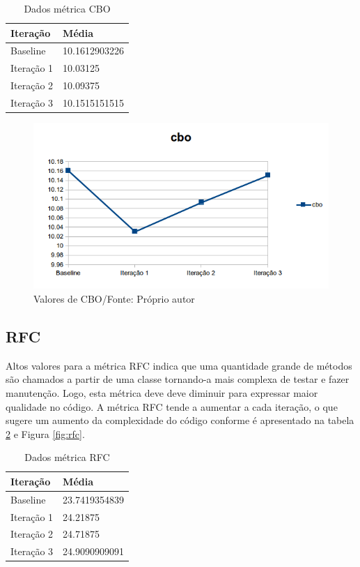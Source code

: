 \begin{table}[!h]
	\centering
	    \caption{Dados métrica CBO}
	
    \begin{tabular}{ | l | l | }
    \hline
    Iteração & Média 			\\ \hline
    Baseline & 10.1612903226   	\\ \hline
    Iteração 1 & 10.03125		\\ \hline
	Iteração 2 & 10.09375		\\ \hline
	Iteração 3 & 10.1515151515	\\ \hline
    \end{tabular}
    \label{tab:cbo}
\end{table}

\begin{figure}[!h]
	\centering
	\includegraphics{img/cbo.png}
	\caption{Valores de CBO/Fonte: Próprio autor}
	\label{fig:cbo}
\end{figure}


\subsection{RFC}

Altos valores para a métrica RFC indica que uma quantidade grande de métodos são
chamados a partir de uma classe tornando-a mais complexa de testar e fazer
manutenção. Logo, esta métrica deve deve diminuir para expressar maior
qualidade no código. A métrica RFC tende a aumentar a cada iteração, o que
sugere um aumento da complexidade do código conforme é apresentado na tabela \ref{tab:rfc} e Figura
\ref{fig:rfc}.

\begin{table}[!h]
	\centering
	    \caption{Dados métrica RFC}
    \begin{tabular}{ | l | l | }
    \hline
    Iteração & Média 			\\ \hline
    Baseline & 23.7419354839   	\\ \hline
    Iteração 1 & 24.21875		\\ \hline
	Iteração 2 & 24.71875		\\ \hline
	Iteração 3 & 24.9090909091	\\ \hline
    \end{tabular}
    \label{tab:rfc}
\end{table}

